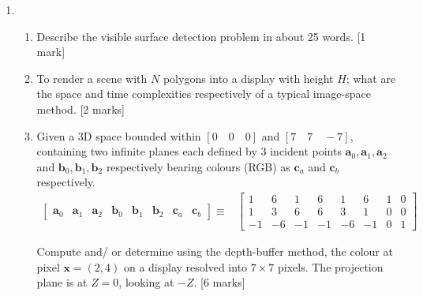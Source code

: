 \documentclass[11pt,a4paper,onecolumn]{qptiet}
\begin{document}
\begin{enumerate}[resume]
\item
  \begin{enumerate}
    \item Describe the visible surface detection
      problem in about 25 words. \hfill [1 mark]
    \item To render a scene with $N$ polygons into a
      display with height $H$; what are the space and
      time complexities respectively of a typical
      image-space method. \hfill [2 marks]
    \item Given a 3D space bounded within
      $[0\quad0\quad0]$ and $[7\quad7\quad-7]$,
      containing two infinite planes each defined by 3
      incident points
      $\mathbf{a}_0, \mathbf{a}_1, \mathbf{a}_2$ and
      $\mathbf{b}_0, \mathbf{b}_1, \mathbf{b}_2$
      respectively bearing colours (RGB) as
      $\mathbf{c}_a$ and $\textbf{c}_b$ respectively.
      \begin{align*}
        \begin{bmatrix}
          \mathbf{a}_0&\mathbf{a}_1&\mathbf{a}_2
          &\mathbf{b}_0&\mathbf{b}_1&\mathbf{b}_2
          &\mathbf{c}_a&\mathbf{c}_b
        \end{bmatrix}\equiv
        &\begin{bmatrix}
          1&6&1&6&1&6&1&0 \\
          1&3&6&6&3&1&0&0 \\
          -1&-6&-1&-1&-6&-1&0&1
        \end{bmatrix}
      \end{align*}

      Compute and/ or determine using the depth-buffer
      method, the colour at pixel $\mathbf{x}=(2,4)$ on
      a display resolved into $7\times7$ pixels. The
      projection plane is at $Z=0$, looking at
      $-Z$. \hfill [6 marks]
  \end{enumerate}
\end{enumerate}
\bvrhrule[0.4pt]
\end{document}
